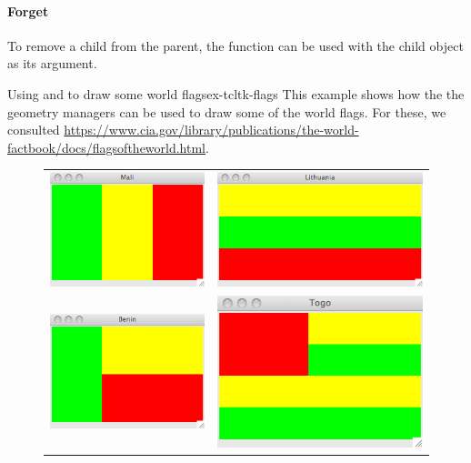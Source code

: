 \paragraph{Forget}
To remove a child from the parent, the 
function can be used with the child object as its argument.


\begin{example}{Using  and  to draw some world flags}{ex-tcltk-flags}
This example shows how the  the  geometry managers can be used to draw some of the world flags. For these, we consulted \url{https://www.cia.gov/library/publications/the-world-factbook/docs/flagsoftheworld.html}.


\begin{figure}
  \centering
  \begin{tabular}{cc}
    \includegraphics[width=.4\textwidth]{fig-tcltk-mali.png}
    & %
    \includegraphics[width=.5\textwidth]{fig-tcltk-lithuania.png}
    \\
    \includegraphics[width=.4\textwidth]{fig-tcltk-benin.png}
    &
    \includegraphics[width=.4\textwidth]{fig-tcltk-togo.png}

\end{tabular}
\end{figure}
\end{example}
